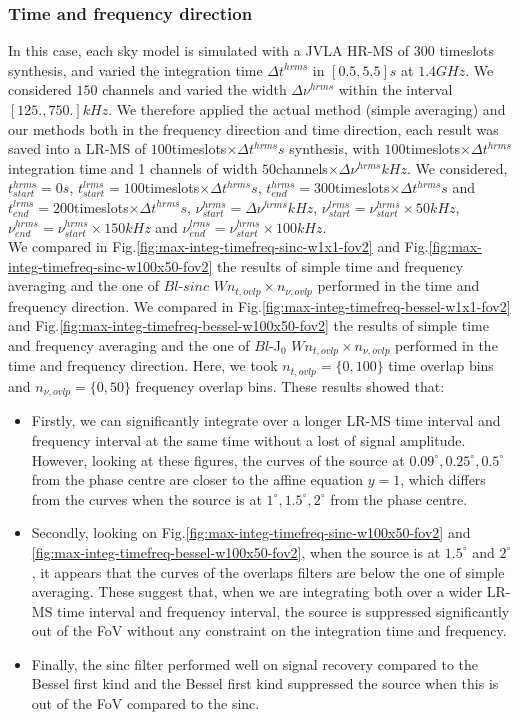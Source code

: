 \documentclass[useAMS,usenatbib]{mn2e}
\begin{document}
\subsubsection{Time and frequency direction}
In this case, each sky model is simulated with a JVLA HR-MS of $300$ timeslots synthesis, and varied  the integration time $\Delta 
t^{hrms}$ in $[0.5,5.5]s$ at $1.4GHz$.  We considered $150$ channels and varied the width $\Delta \nu^{hrms}$  within the interval $[ 
125.,750.]kHz$. We therefore applied the actual method (simple averaging) and our methods both in the frequency direction and time 
direction, each result was saved into a LR-MS of  $100$timeslots$\times\Delta t^{hrms}s$ synthesis, with $100$timeslots$\times\Delta 
t^{hrms}$ integration time and 1 channels of width $50$channels$\times\Delta \nu^{hrms}kHz$. We considered, $t^{hrms}_{start}=0s$, 
$t^{lrms}_{start}=100$timeslots$\times\Delta t^{hrms} s$, $t^{hrms}_{end}=300$timeslots$\times\Delta t^{hrms}s$ and 
$t^{lrms}_{end}=200$timeslots$\times\Delta t^{hrms}s$, $\nu^{hrms}_{start}=\Delta \nu^{hrms}kHz$, 
$\nu^{lrms}_{start}=\nu^{hrms}_{start}\times50 kHz$, $\nu^{hrms}_{end}=\nu^{hrms}_{start}\times150 kHz$ and 
$\nu^{lrms}_{end}=\nu^{hrms}_{start}\times100 kHz$.\\ 
We compared in Fig.\ref{fig:max-integ-timefreq-sinc-w1x1-fov2} and Fig.\ref{fig:max-integ-timefreq-sinc-w100x50-fov2}  the results of 
simple time and frequency averaging and the one of  $Bl$-$sinc$ $W n_{t,ovlp}\times n_{\nu,ovlp}$ performed in the time and frequency 
direction. We compared in Fig.\ref{fig:max-integ-timefreq-bessel-w1x1-fov2} and Fig.\ref{fig:max-integ-timefreq-bessel-w100x50-fov2} the 
results of simple time and frequency averaging and the one of  $Bl$-J$_0$ $W n_{t,ovlp}\times n_{\nu,ovlp}$ performed in the time and 
frequency direction. Here, we took $n_{t,ovlp}=\{0,100\}$ time overlap bins and $n_{\nu,ovlp}=\{0,50\}$ frequency overlap bins. These 
results showed that:
\begin{itemize}
 \item Firstly, we can significantly integrate over a longer LR-MS time interval and frequency interval at the same time without a lost of 
signal amplitude. However, looking at these figures, the curves of the source at $0.09^{\circ},0.25^{\circ},0.5^{\circ}$ from the phase 
centre are closer to the affine equation $y=1$, which differs from the curves when the source is at $1^{\circ},1.5^{\circ}, 2^{\circ}$ from 
the phase centre. 
 \item Secondly, looking on Fig.\ref{fig:max-integ-timefreq-sinc-w100x50-fov2} and \ref{fig:max-integ-timefreq-bessel-w100x50-fov2}, when 
the source is at $1.5^{\circ}$ and $2^{\circ}$, it appears that the curves of the overlaps filters are below the one of simple averaging. 
These suggest that, when we are integrating both over a wider LR-MS time interval and frequency interval, the source is suppressed 
significantly out of the FoV without any constraint on the integration time and frequency.
 \item Finally, the sinc filter performed well on signal recovery compared to the Bessel first kind and the Bessel first kind suppressed 
the 
source when this is out of the FoV compared to the sinc.  
\end{itemize}
\end{document}
